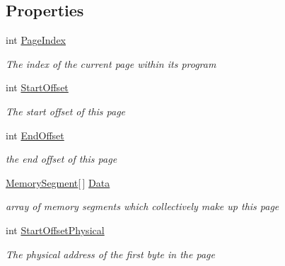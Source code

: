 \subsection*{Properties}
\begin{DoxyCompactItemize}
\item 
int \hyperlink{class_c_p_u___o_s___simulator_1_1_memory_1_1_memory_page_aec80700d036a447e7e6ec204513e3a59}{Page\+Index}
\begin{DoxyCompactList}\small\item\em The index of the current page within its program \end{DoxyCompactList}\item 
int \hyperlink{class_c_p_u___o_s___simulator_1_1_memory_1_1_memory_page_ad700979e51dd3d05470c681588c6fa79}{Start\+Offset}
\begin{DoxyCompactList}\small\item\em The start offset of this page \end{DoxyCompactList}\item 
int \hyperlink{class_c_p_u___o_s___simulator_1_1_memory_1_1_memory_page_abe850b4a088a820ecf598af1cd9a7deb}{End\+Offset}
\begin{DoxyCompactList}\small\item\em the end offset of this page \end{DoxyCompactList}\item 
\hyperlink{class_c_p_u___o_s___simulator_1_1_memory_1_1_memory_segment}{Memory\+Segment}\mbox{[}$\,$\mbox{]} \hyperlink{class_c_p_u___o_s___simulator_1_1_memory_1_1_memory_page_a8bf84e82146f9ff35ffbcc32b93a9db0}{Data}
\begin{DoxyCompactList}\small\item\em array of memory segments which collectively make up this page \end{DoxyCompactList}\item 
int \hyperlink{class_c_p_u___o_s___simulator_1_1_memory_1_1_memory_page_af31a2243a3e68ec635315929859fa358}{Start\+Offset\+Physical}
\begin{DoxyCompactList}\small\item\em The physical address of the first byte in the page \end{DoxyCompactList}\item 

\end{DoxyCompactItemize}
